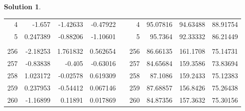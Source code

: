 \documentclass[a4paper, 10pt]{article}
\theoremstyle{definition}
\theoremstyle{hSol}
\newtheorem*{solution}{Solution}
\begin{document}
\begin{solution}
\begin{table}[htbp]
\begin{tabular}{rrrrrrrrr}
    4     & -1.657 & -1.42633 & -0.47922 &       & 4     & 95.07816 & 94.63488 & 88.91754 \\
    5     & 0.247389 & -0.88206 & -1.10601 &       & 5     & 95.7364 & 92.33332 & 86.21449 \\
          &       &       &       &       &       &       &       &  \\
    256   & -2.18253 & 1.761832 & 0.562654 &       & 256   & 86.66135 & 161.1708 & 75.14731 \\
    257   & -0.83838 & -0.405 & -0.63016 &       & 257   & 84.65684 & 159.3586 & 73.83694 \\
    258   & 1.023172 & -0.02578 & 0.619309 &       & 258   & 87.1086 & 159.2433 & 75.12383 \\
    259   & 0.237953 & -0.54412 & 0.067146 &       & 259   & 87.68857 & 156.8426 & 75.26438 \\
    260   & -1.16899 & 0.11891 & 0.017869 &       & 260   & 84.87356 & 157.3632 & 75.30156 \\
    \end{tabular}%
  \label{tab:addlabel}%
\end{table}%

\end{solution}
\end{document}
